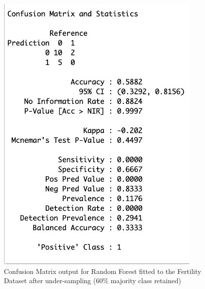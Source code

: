 \begin{figure}[!htbp]
    \centering
    \begin{minipage}{0.45\textwidth}
        \centering
        \includegraphics[width=0.9\textwidth]{ThesisTemplate/appendix/images/Chapter5Appendix/ConfusionMatrix60/Fertility.png}
        \caption{Confusion Matrix output for Random Forest fitted to the Fertility Dataset after under-sampling (60\% majority class retained)}
        \label{fig:my_label}
    \end{minipage}\hfill
    \begin{minipage}{0.45\textwidth}
        \centering

\end{minipage}
\end{figure}
